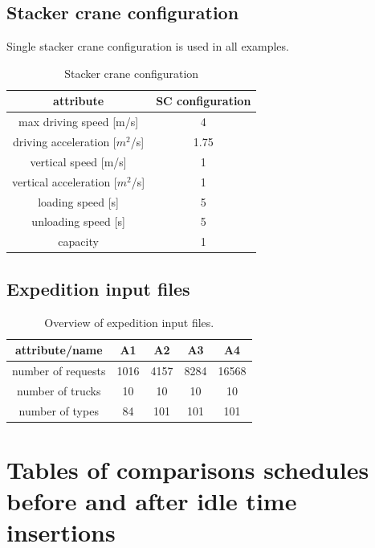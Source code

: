 \documentclass{ctuthesis}
\begin{document}
\section{Stacker crane configuration}

Single stacker crane configuration is used in all examples.

\begin{table}[H]
\begin{tabular}{ |c|| c |} 
\hline
attribute & SC configuration\\ 
\hline
max driving speed [m/s] & 4  \\
\hline
driving acceleration [$m^2$/s] & 1.75\\
\hline
vertical speed [m/s] & 1\\
\hline
vertical acceleration [$m^2$/s] & 1\\
\hline
loading speed [s] & 5\\ 
\hline
unloading speed [s] & 5\\ 
\hline
capacity & 1\\ 
\hline
\end{tabular}
\caption{Stacker crane configuration} \label{tab:scconf}
\end{table}

\section{Expedition input files}
\begin{table}[H]
\begin{tabular}{ |c| c c c c|} 
\hline
attribute/name & A1 & A2 & A3 & A4\\ 
\hline
number of requests & 1016 & 4157 & 8284 & 16568 \\
\hline
number of trucks & 10 & 10 & 10 & 10 \\ 
\hline
number of types & 84 & 101 & 101 & 101 \\ 
\hline
\end{tabular}
\caption{Overview of expedition input files.} \label{tab:in2}
\end{table}

\chapter{Tables of comparisons schedules before and after idle time insertions}
\end{document}
